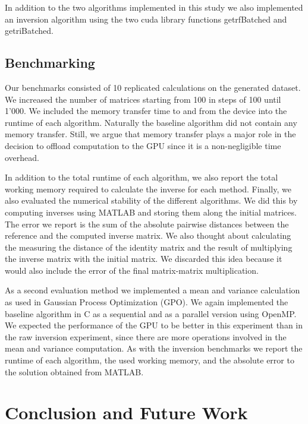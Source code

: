 \documentclass[11pt]{article}
\begin{document}
In addition to the two algorithms implemented in this study we also implemented an inversion algorithm using the two cuda library functions getrfBatched and getriBatched.

\subsection{Benchmarking}

Our benchmarks consisted of 10 replicated calculations on the generated dataset. We increased the number of matrices starting from 100 in steps of 100 until 1’000. We included the memory transfer time to and from the device into the runtime of each algorithm. Naturally the baseline algorithm did not contain any memory transfer. Still, we argue that memory transfer plays a major role in the decision to offload computation to the GPU since it is a non-negligible time overhead.

In addition to the total runtime of each algorithm, we also report the total working memory required to calculate the inverse for each method. Finally, we also evaluated the numerical stability of the different algorithms. We did this by computing inverses using MATLAB and storing them along the initial matrices. The error we report is the sum of the absolute pairwise distances between the reference and the computed inverse matrix. We also thought about calculating the measuring the distance of the identity matrix and the result of multiplying the inverse matrix with the initial matrix. We discarded this idea because it would also include the error of the final matrix-matrix multiplication.

As a second evaluation method we implemented a mean and variance calculation as used in Gaussian Process Optimization (GPO). We again implemented the baseline algorithm in C as a sequential and as a parallel version using OpenMP. We expected the performance of the GPU to be better in this experiment than in the raw inversion experiment, since there are more operations involved in the mean and variance computation. As with the inversion benchmarks we report the runtime of each algorithm, the used working memory, and the absolute error to the solution obtained from MATLAB.

\section{Conclusion and Future Work}

\newpage



\end{document}
